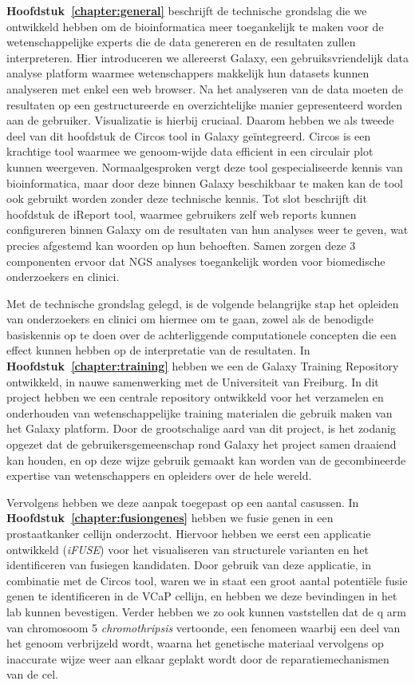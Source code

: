 \textbf{Hoofdstuk~\ref{chapter:general}} beschrijft de technische grondslag die we ontwikkeld hebben om de bioinformatica meer toegankelijk te maken voor de wetenschappelijke experts die de data genereren en de resultaten zullen interpreteren.
Hier introduceren we allereerst Galaxy, een gebruiksvriendelijk data analyse platform waarmee wetenschappers makkelijk hun datasets kunnen analyseren met enkel een web browser. Na het analyseren van de data moeten de resultaten op een gestructureerde en overzichtelijke manier gepresenteerd worden aan de gebruiker. Visualizatie is hierbij cruciaal.
Daarom hebben we als tweede deel van dit hoofdstuk de Circos tool in Galaxy geïntegreerd. Circos is een krachtige tool waarmee we genoom-wijde data efficient in een circulair plot kunnen weergeven.
Normaalgesproken vergt deze tool gespecialiseerde kennis van bioinformatica, maar door deze binnen Galaxy beschikbaar te maken kan de tool ook gebruikt worden zonder deze technische kennis.
Tot slot beschrijft dit hoofdstuk de iReport tool, waarmee gebruikers zelf web reports kunnen configureren binnen Galaxy om de resultaten van hun analyses weer te geven, wat precies afgestemd kan woorden op hun behoeften.
Samen zorgen deze 3 componenten ervoor dat NGS analyses toegankelijk worden voor biomedische onderzoekers en clinici.

Met de technische grondslag gelegd, is de volgende belangrijke stap het opleiden van onderzoekers
en clinici om hiermee om te gaan, zowel als de benodigde basiskennis op te doen over de achterliggende computationele concepten die een effect kunnen hebben op de interpretatie van de resultaten.
In \textbf{Hoofdstuk~\ref{chapter:training}} hebben we een de Galaxy Training Repository ontwikkeld, in nauwe samenwerking met de Universiteit van Freiburg.
In dit project hebben we een centrale repository ontwikkeld voor het verzamelen en onderhouden van wetenschappelijke training materialen die gebruik maken van het Galaxy platform.
Door de grootschalige aard van dit project, is het zodanig opgezet dat de gebruikersgemeenschap rond Galaxy het project samen draaiend kan houden, en op deze wijze gebruik gemaakt kan worden van de gecombineerde expertise van wetenschappers en opleiders over de hele wereld.

Vervolgens hebben we deze aanpak toegepast op een aantal casussen. In \textbf{Hoofdstuk~\ref{chapter:fusiongenes}} hebben we fusie genen in een prostaatkanker cellijn onderzocht. Hiervoor hebben we eerst een applicatie ontwikkeld (\emph{iFUSE}) voor het visualiseren van structurele varianten en het identificeren van fusiegen kandidaten.
Door gebruik van deze applicatie, in combinatie met de Circos tool, waren we in staat een groot aantal potentiële fusie genen te identificeren in de VCaP cellijn, en hebben we deze bevindingen in het lab kunnen bevestigen.
Verder hebben we zo ook kunnen vaststellen dat de q arm van chromosoom 5 \emph{chromothripsis} vertoonde, een fenomeen waarbij een deel van het genoom verbrijzeld wordt, waarna het genetische materiaal vervolgens op inaccurate wijze weer aan elkaar geplakt wordt door de reparatiemechanismen van de cel.

